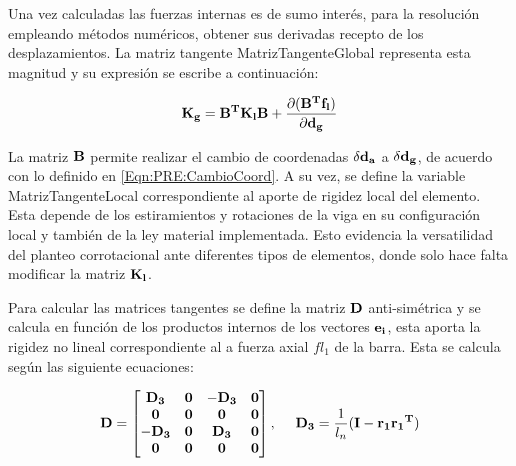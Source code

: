 Una vez calculadas las fuerzas internas es de sumo interés, para la resolución empleando métodos numéricos, obtener sus derivadas recepto de los desplazamientos. La matriz tangente \gls{MatrizTangenteGlobal} representa esta magnitud y su expresión se escribe a continuación:

\begin{equation}\label{Eqn:PRE:MatrizKest1}
\bf{K_g}=\bf{B}^T\bf{K_l}\bf{B}+\frac{\partial (\bf{B}^T\bf{f}_l)}{\partial \bf{d}_g}
\end{equation}


La matriz $\bf{B}$ permite realizar el cambio de coordenadas $\delta \bf{d_a}$ a  $\delta \bf{d_g}$, de acuerdo con lo definido en \eqref{Eqn:PRE:CambioCoord}. A su vez, se define la variable \gls{MatrizTangenteLocal} correspondiente al aporte de rigidez local del elemento. Esta depende de los estiramientos y rotaciones de la viga en su configuración local y también de la ley material implementada. Esto evidencia la versatilidad del planteo corrotacional ante diferentes tipos de elementos, donde solo hace falta modificar la matriz $\bf{K_l}$.

Para calcular las matrices tangentes se define la matriz  $\bf{D}$  anti-simétrica y se calcula en función de los productos internos de los vectores $\bf{e_i}$, esta aporta la rigidez no lineal correspondiente al a fuerza axial $fl_1$ de la barra. Esta se calcula según las siguiente ecuaciones:

\begin{equation}
	\label{Eqn:PRE:DefD}
	\bf{D}=\begin{bmatrix}
	\bf{D_3}& \bf{0}   & -\bf{D_3}   & \bf{0} \\
	\bf{0}  & \bf{0} & \bf{0}   & \bf{0}\\
	-\bf{D_3}  & \bf{0}   & \bf{D_3} & \bf{0} \\
	\bf{0}  & \bf{0}   & \bf{0}   & \bf{0}
\end{bmatrix},~~~~\bf{D_3}=\frac{\text{1}}{\text{$l_n$}}(\bf{I}-\bf{r_1}\bf{r_1}^T)
\end{equation}

